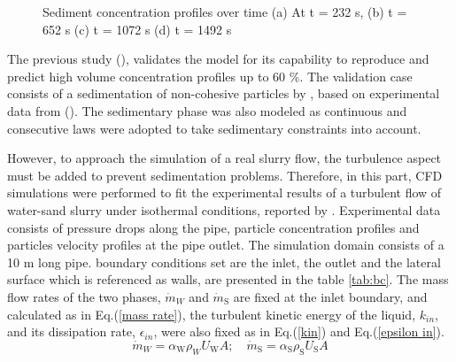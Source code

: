 \documentclass[review,3p,times,12pt]{elsarticle}
\begin{document}
\begin{figure}[H]
    \centering
    \caption{Sediment concentration profiles over time (a) At t = 232 s, (b) t = 652 s (c) t = 1072 s (d) t = 1492 s}
    \label{fig:laminar}
\end{figure}
The previous study (\citet{elkarii2020towards}), validates the model for its capability to reproduce and predict high volume concentration profiles up to 60 $\%$. The validation case consists of a sedimentation of non-cohesive particles by \citet{chauchat}, based on experimental data from (\citet{Pha-2008}). The sedimentary phase was also modeled as continuous and consecutive laws were adopted to take sedimentary constraints into account.

However, to approach the simulation of a real slurry flow, the turbulence aspect must be added to prevent sedimentation problems. Therefore, in this part, CFD simulations were performed to fit the experimental results of a turbulent flow of water-sand slurry under isothermal conditions, reported by \citet{Randal-2004}. Experimental data consists of pressure drops along the pipe, particle concentration profiles and particles velocity profiles at the pipe outlet. The simulation domain consists of a 10 m long pipe. boundary conditions set are the inlet, the outlet and the lateral surface which is referenced as walls, are presented in the table \ref{tab:bc}. The mass flow rates of the two phases, \(\dot{m}_{W}\) and \(\dot{m}_{\mathrm{S}}\) are fixed at the inlet boundary, and calculated as in Eq.(\ref{mass rate}), the turbulent kinetic energy of the liquid, \(k_{in}\), and its dissipation rate, \(\epsilon_{in }\), were also fixed as in Eq.(\ref{kin}) and Eq.(\ref{epsilon in}). 
\begin{equation}
\dot{m}_{W}= \alpha_{\mathrm{W}} \rho_{W} U_{\mathrm{W}} A;\quad \dot{m}_{\mathrm{S}}= \alpha_{\mathrm{S}} \rho_{\mathrm{S}} U_{\mathrm{S}} A
\label{mass rate}
\end{equation}
\end{document}
